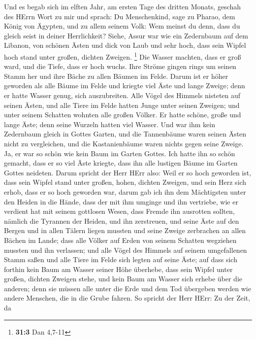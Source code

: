  Und es begab sich im elften Jahr, am ersten Tage des
dritten Monats, geschah des HErrn Wort zu mir und sprach: 
Du Menschenkind, sage zu Pharao, dem König von Ägypten, und zu allem
seinem Volk: Wem meinst du denn, dass du gleich seist in deiner
Herrlichkeit?  Siehe, Assur war wie ein Zedernbaum auf dem
Libanon, von schönen Ästen und dick von Laub und sehr hoch, dass sein
Wipfel hoch stand unter großen, dichten Zweigen. \footnote{\textbf{31:3}
  Dan 4,7-11}  Die Wasser machten, dass er groß ward, und
die Tiefe, dass er hoch wuchs. Ihre Ströme gingen rings um seinen Stamm
her und ihre Bäche zu allen Bäumen im Felde.  Darum ist er
höher geworden als alle Bäume im Felde und kriegte viel Äste und lange
Zweige; denn er hatte Wasser genug, sich auszubreiten. 
Alle Vögel des Himmels nisteten auf seinen Ästen, und alle Tiere im
Felde hatten Junge unter seinen Zweigen; und unter seinem Schatten
wohnten alle großen Völker.  Er hatte schöne, große und
lange Äste; denn seine Wurzeln hatten viel Wasser.  Und
war ihm kein Zedernbaum gleich in Gottes Garten, und die Tannenbäume
waren seinen Ästen nicht zu vergleichen, und die Kastanienbäume waren
nichts gegen seine Zweige. Ja, er war so schön wie kein Baum im Garten
Gottes.  Ich hatte ihn so schön gemacht, dass er so viel
Äste kriegte, dass ihn alle lustigen Bäume im Garten Gottes neideten.
 Darum spricht der Herr HErr also: Weil er so hoch
geworden ist, dass sein Wipfel stand unter großen, hohen, dichten
Zweigen, und sein Herz sich erhob, dass er so hoch geworden war,
 darum gab ich ihn dem Mächtigsten unter den Heiden in
die Hände, dass der mit ihm umginge und ihn vertriebe, wie er verdient
hat mit seinem gottlosen Wesen,  dass Fremde ihn
ausrotten sollten, nämlich die Tyrannen der Heiden, und ihn zerstreuen,
und seine Äste auf den Bergen und in allen Tälern liegen mussten und
seine Zweige zerbrachen an allen Bächen im Lande; dass alle Völker auf
Erden von seinem Schatten wegziehen mussten und ihn verlassen;
 und alle Vögel des Himmels auf seinem umgefallenen Stamm
saßen und alle Tiere im Felde sich legten auf seine Äste;
 auf dass sich forthin kein Baum am Wasser seiner Höhe
überhebe, dass sein Wipfel unter großen, dichten Zweigen stehe, und kein
Baum am Wasser sich erhebe über die anderen; denn sie müssen alle unter
die Erde und dem Tod übergeben werden wie andere Menschen, die in die
Grube fahren.  So spricht der Herr HErr: Zu der Zeit, da
